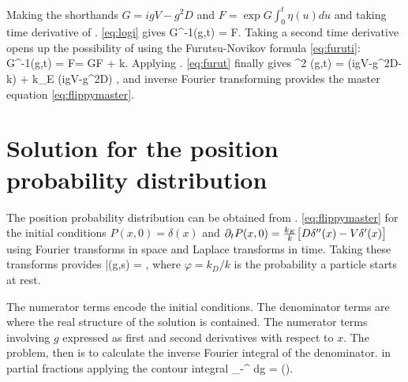 Making the shorthands $G = igV-g^2D$ and $F=\exp G\int_0^t \eta(u)du$ and taking \DIFdelbegin {}\DIFdelend \DIFaddbegin {}\DIFaddend time derivative of \DIFdelbegin {}\DIFdelend \DIFaddbegin {}\DIFaddend . \ref{eq:logi} gives
\be G^{-1}\pt {}(g,t) = \bra \eta F\ket. \label{eq:furut}\ee
Taking a second time derivative opens up the possibility of using the Furutsu-Novikov formula \ref{eq:furuti}: 
\be G^{-1}\pt {}(g,t) = \pt \bra \eta F\ket = G\bra \eta F \ket + k. \ee
Applying \DIFdelbegin {}\DIFdelend \DIFaddbegin {}\DIFaddend . \ref{eq:furut} finally gives
\be \pt^2 (g,t)  = (igV-g^2D-k)\pt  {} + k_E (igV-g^2D) ,\ee
and inverse Fourier transforming provides the master equation \ref{eq:flippymaster}.

\section{Solution for the position probability distribution}
\label{sec:fluccymastersol}
The position probability distribution can be obtained from \DIFdelbegin {}\DIFdelend \DIFaddbegin {}\DIFaddend . \ref{eq:flippymaster} for the initial conditions $P(x,0) = \delta(x)$ and $ \partial_t P(x,0) = \frac{k_E}{k}\big[D\delta''(x)-V \delta'(x) \big]$ using Fourier transforms in space and Laplace transforms in time. Taking these transforms provides
\be \bar{}(g,s) = ,  \DIFaddbegin \label{eq:prev}\DIFaddend \ee
where $\varphi = k_D/k$ is the probability a particle starts at rest.

The numerator terms encode the initial conditions. The denominator terms are where the real structure of the solution is contained.
The numerator terms involving $g$ \DIFdelbegin {}\DIFdelend \DIFaddbegin {}\DIFaddend expressed as first and second derivatives with respect to $x$. The problem, then is to calculate the inverse Fourier integral of the denominator.
\DIFdelbegin {}\DIFdelend \DIFaddbegin {}\DIFaddend in partial fractions \DIFdelbegin {}\DIFdelend \DIFaddbegin {}\DIFaddend applying the contour integral \citep[e.g.][]{Arfken1985}
\be \int_{-\infty}^\infty {} \DIFdelbegin {}\DIFdelend \DIFaddbegin {}\DIFaddend dg = \DIFdelbegin {}\DIFdelend \DIFaddbegin {}\big(\big)\DIFaddend . \label{eq:contour}\ee
\DIFaddbegin {}\DIFaddend 

